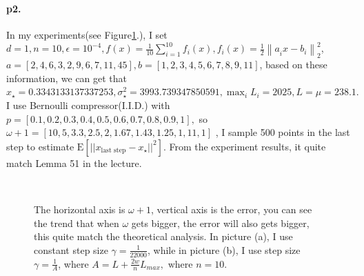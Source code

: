 \documentclass[12pt,a4paper]{article}
\begin{document}
	\paragraph{p2.}
	In my experiments(see Figure\ref{img2}.), I set $d = 1, n = 10, \epsilon = 10^{-4},  f(x)=\frac{1}{ 10} \sum_{i=1}^{10} f_i(x), f_i(x) = \frac{1}{2}\left\|a_{i}^{} x-b_{i}\right\|_{2}^{2}$, $a = [2,4,6,3,2,9,6,7,11,45], b = [1,2,3,4,5,6,7,8,9,11]$, based on these information, we can get that $x_{\star} = 0.3343133137337253, \sigma_{\star}^2 = 3993.739347850591, \max_{i} L_i = 2025, L = \mu = 238.1. $I use Bernoulli compressor(I.I.D.) with $p=\left[0.1,0.2,0.3,0.4,0.5,0.6,0.7,0.8,0.9,1\right],$ so
	\newline $\omega+1=\left[10,5,3.3,2.5,2,1.67,1.43,1.25,1,11,1\right]$ , I sample 500 points in the last step to estimate $\mathrm{E}\left[||x_{\text{last step}}-x_{\star}||^2\right]$. From the experiment results, it quite match Lemma 51 in the lecture.
	\begin{figure}
		\centering
		\\ %
		
		
		\caption{  The horizontal axis is $\omega+1$, vertical axis is the error, you can see the trend that when $\omega$ gets bigger, the error will also gets bigger, this quite match the theoretical analysis. In picture (a), I use constant step size $\gamma=\frac{1}{22000}$, while in picture (b), I use step size $\gamma =\frac{1}{A}$, where $A = L+\frac{2w}{n}L_{max},\text{  where  }   n=10$.} %
		\label{img2}
	\end{figure}
	
\end{document}
